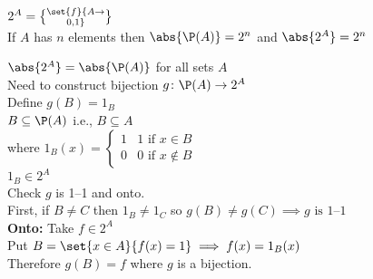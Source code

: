 $2^A = \set{f}{A\to\brace{0,1}}$ \\
If $A$ has $n$ elements then $\abs{\P(A)}=2^n$ and $\abs{2^A}=2^n$

\thm $\abs{2^A}=\abs{\P(A)}$ for all sets $A$ \\
\pf Need to construct bijection $g\colon\P(A)\to2^A$ \\
Define $g(B)=1_B$ \\
$B\subseteq\P(A)$ i.e., $B\subseteq A$ \\
where $1_B(x) = \begin{cases}
1 & \text{$1$ if $x\in B$} \\
0 & \text{$0$ if $x\notin B$}
\end{cases}$ \\
$1_B \in 2^A$ \\
Check $g$ is 1--1 and onto. \\
First, if $B\neq C$ then $1_B\neq1_C$ so $g(B)\neq g(C)\implies\text{$g$ is 1--1}$ \\
\textbf{Onto:} Take $f\in2^A$ \\
Put $B=\set{x\in A}{f(x)=1}\implies f(x)=1_B(x)$ \\
Therefore $g(B)=f$ where $g$ is a bijection.

